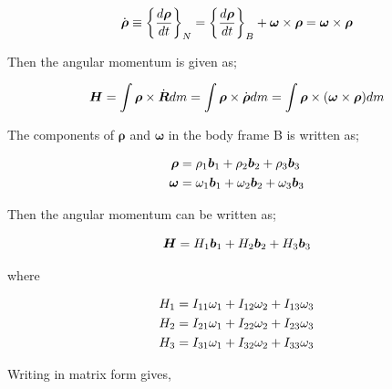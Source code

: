 \begin{equation}{\label{eqn:kinematicEquDQM}}
\dot{\bm{\rho}} \equiv \bigg\{ \frac{d\bm{\rho}}{dt} \bigg\}_N = \bigg\{ \frac{d\bm{\rho}}{dt} \bigg\}_B + \bm{\omega} \times \bm{\rho} = \bm{\omega} \times \bm{\rho}
\end{equation}

Then the angular momentum is given as;

\begin{equation}{\label{eqn:kinematicEquDQM}}
\bm{H} = \int \bm{\rho} \times \dot{\bm{R}} dm = \int \bm{\rho} \times \dot{\bm{\rho}} dm = \int \bm{\rho} \times  (\bm{\omega} \times \bm{\rho} )dm
\end{equation}

The components of $\bm{\rho}$ and $\bm{\omega}$ in the body frame B is written as;

\begin{align}{\label{eqn:omega_and_rho}}
\begin{split}
\bm{\rho} & = \rho_1 \bm{b}_1 + \rho_2 \bm{b}_2 + \rho_3 \bm{b}_3 \\
\bm{\omega} & = \omega_1 \bm{b}_1 + \omega_2 \bm{b}_2 + \omega_3 \bm{b}_3 \\
\end{split}
\end{align}

Then the angular momentum can be written as;

\begin{equation}{\label{eqn:angMomentumComp}}
\bm{H} = H_1 \bm{b}_1 + H_2 \bm{b}_2 + H_3 \bm{b}_3 
\end{equation}

where

\begin{align}{\label{eqn:angularMomentum1}}
\begin{split}
H_1 & = I_{11} \omega_1 + I_{12} \omega_2 + I_{13} \omega_3 \\
H_2 & = I_{21} \omega_1 + I_{22} \omega_2 + I_{23} \omega_3 \\
H_3 & = I_{31} \omega_1 + I_{32} \omega_2 + I_{33} \omega_3 \\
\end{split}
\end{align}

Writing in matrix form gives,

